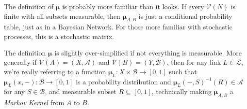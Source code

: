 \documentclass{article}
\newcommand\bmu{\boldsymbol{\mu}}
\begin{document}
	The definition of $\bmu$ is probably more familiar than it looks. If every $\mathcal V(N)$ is finite with all subsets measurable, then $\bmu_{A,B}$ is just a conditional probability table, just as in a Bayesian Network. For those more familiar with stochastic processes, this is a stochastic matrix. 

	The definition $\bmu$ is slightly over-simplified if not everything is measurable. More generally if $\mathcal V(A) = (X, \mathcal A)$ and $\mathcal V(B) = (Y, \mathcal B)$, then for any link $L \in \mathcal L$, we're really referring to a function $\bmu_L : X \times \mathcal B \to [0,1]$ such that $\bmu_L(x,-): \mathcal B \to [0,1]$ is a probability distribution and $\bmu_L(-, S)^{-1}(R) \in \mathcal A$ for any $S \in \mathcal B$, and measurable subset $R \subseteq [0,1]$, technically making $\bmu_{A,B}$ a \textit{Markov Kernel} from $A$ to $B$.
\end{document}
